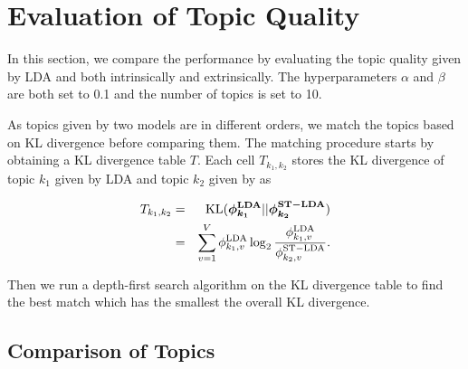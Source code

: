 \section{Evaluation of Topic Quality}
\label{sec:eva}

In this section, we compare the performance by evaluating the topic quality given by LDA and \stlda both intrinsically and extrinsically. The hyperparameters $\alpha$ and $\beta$ are both set to 0.1 and the number of topics is set to 10.

As topics given by two models are in different orders, we match the topics based on KL divergence before comparing them. The matching procedure starts by obtaining a KL divergence table $T$. Each cell $T_{k_1,k_2}$ stores the KL divergence of topic $k_1$ given by LDA and topic $k_2$ given by \stlda as

\begin{eqnarray}
T_{k_1,k_2}&=&\mathrm{KL}(\bm{\phi_{k_1}^\mathrm{LDA}}||\bm{\phi_{k_2}^\mathrm{ST-LDA}})\\
&=&\sum_{v=1}^{V} \phi_{k_1,v}^{\mathrm{LDA}} \log_2 \frac{\phi_{k_1,v}^{\mathrm{LDA}}}{\phi_{k_2,v}^{\mathrm{ST-LDA}}}.
\end{eqnarray}

Then we run a depth-first search algorithm on the KL divergence table to find the best match which has the smallest the overall KL divergence.

\subsection{Comparison of Topics}

